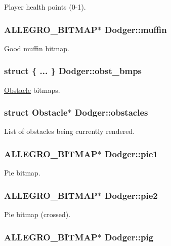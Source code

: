 Player health points (0-\/1). \hypertarget{structDodger_a9848452f9b8886eaeb49824abd98cfa2}{
\subsubsection[{muffin}]{\setlength{\rightskip}{0pt plus 5cm}A\+L\+L\+E\+G\+R\+O\+\_\+\+B\+I\+T\+M\+A\+P$\ast$ Dodger\+::muffin}}\label{structDodger_a9848452f9b8886eaeb49824abd98cfa2}
Good muffin bitmap. \hypertarget{structDodger_a77082385b2097f38e321f99c2ecf98e1}{
\subsubsection[{obst\+\_\+bmps}]{\setlength{\rightskip}{0pt plus 5cm}struct \{ ... \}   Dodger\+::obst\+\_\+bmps}}\label{structDodger_a77082385b2097f38e321f99c2ecf98e1}
\hyperlink{structObstacle}{Obstacle} bitmaps. \hypertarget{structDodger_a114a5a2b5b3640ce2bd7b5a9f7486dfc}{
\subsubsection[{obstacles}]{\setlength{\rightskip}{0pt plus 5cm}struct {\bf Obstacle}$\ast$ Dodger\+::obstacles}}\label{structDodger_a114a5a2b5b3640ce2bd7b5a9f7486dfc}
List of obstacles being currently rendered. \hypertarget{structDodger_a4f7d7343cac6f73d52ad090f3a6a19c3}{
\subsubsection[{pie1}]{\setlength{\rightskip}{0pt plus 5cm}A\+L\+L\+E\+G\+R\+O\+\_\+\+B\+I\+T\+M\+A\+P$\ast$ Dodger\+::pie1}}\label{structDodger_a4f7d7343cac6f73d52ad090f3a6a19c3}
Pie bitmap. \hypertarget{structDodger_a10322a7b25a6622f22dbde738d58151c}{
\subsubsection[{pie2}]{\setlength{\rightskip}{0pt plus 5cm}A\+L\+L\+E\+G\+R\+O\+\_\+\+B\+I\+T\+M\+A\+P$\ast$ Dodger\+::pie2}}\label{structDodger_a10322a7b25a6622f22dbde738d58151c}
Pie bitmap (crossed). \hypertarget{structDodger_a940e169cb64d0cd3d3a532e9b54ab4a0}{
\subsubsection[{pig}]{\setlength{\rightskip}{0pt plus 5cm}A\+L\+L\+E\+G\+R\+O\+\_\+\+B\+I\+T\+M\+A\+P$\ast$ Dodger\+::pig}}\label{structDodger_a940e169cb64d0cd3d3a532e9b54ab4a0}
